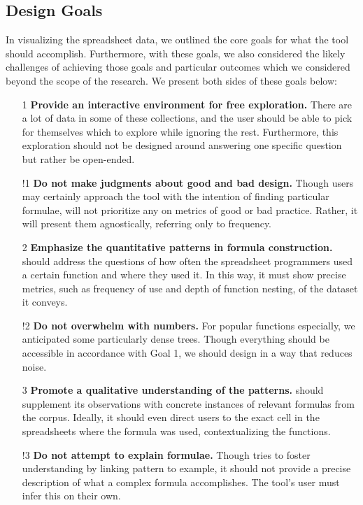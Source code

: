 \documentclass[conference]{IEEEtran}
\begin{document}
	\subsection{Design Goals} In visualizing the spreadsheet data, we outlined the
	core goals for what the tool should accomplish. Furthermore, with these goals,
	we also considered the likely challenges of achieving those goals and
	particular outcomes which we considered beyond the scope of the research. We
	present both sides of these goals below:
	
	\begin{itemize}
		
		\item [1] \textbf{Provide an interactive environment for free exploration.}
		There are a lot of data in some of these collections, and the user should be
		able to pick for themselves which to explore while ignoring the rest. Furthermore,
		this exploration should not be designed around answering one specific question
		but rather be open-ended.
		
		\item [!1] \textbf{Do not make judgments about good and bad design.} Though
		users may certainly approach the tool with the intention of finding particular
		formulae, \toolname will not prioritize any on metrics of good or bad
		practice. Rather, it will present them agnostically, referring only to
		frequency.
		
		\item [2] \textbf{Emphasize the quantitative patterns in formula
			construction.} \toolname should address the questions of how often the
		spreadsheet programmers used a certain function and where they used it. In
		this way, it must show precise metrics, such as frequency of use and depth of
		function nesting, of the dataset it conveys.
		
		\item [!2] \textbf{Do not overwhelm with numbers.} For popular functions
		especially, we anticipated some particularly dense trees. Though
		everything should be accessible in accordance with Goal 1, we should design in
		a way that reduces noise.
		
		\item [3] \textbf{Promote a qualitative understanding of the patterns.}
		\toolname should supplement its observations with concrete instances of
		relevant formulas from the corpus. Ideally, it should even direct users to the
		exact cell in the spreadsheets where the formula was used, contextualizing the
		functions.
		
		\item [!3] \textbf{Do not attempt to explain formulae.} Though \toolname tries
		to foster understanding by linking pattern to example, it should not provide
		a precise description of what a complex formula accomplishes. The tool's user
		must infer this on their own.
		
	\end{itemize}
	
\end{document}
